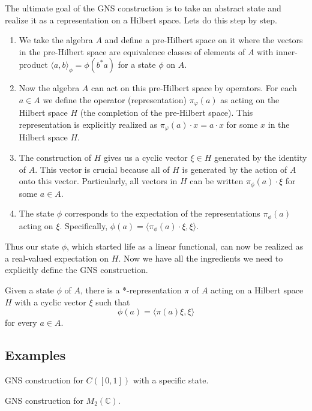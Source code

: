 The ultimate goal of the GNS construction is to take an abstract state
and realize it as a representation on a Hilbert space. Lets do this step by step.
\begin{enumerate}
    \item We take the algebra $A$ and define a pre-Hilbert space on it where the vectors
    in the pre-Hilbert space are equivalence classes of elements of $A$ with inner-product
    $\langle a, b \rangle_\phi = \phi(b^*a)$ for a state $\phi$ on $A$.
    \item Now the algebra $A$ can act on this pre-Hilbert space by operators. For
    each $a \in A$ we define the operator (representation) $\pi_\varphi (a)$ as acting
    on the Hilbert space $H$ (the completion of the pre-Hilbert space). This representation
    is explicitly realized as $\pi_\varphi(a) \cdot x = a \cdot x$ for some $x$ in
    the Hilbert space $H$.
    \item The construction of $H$ gives us a cyclic vector $\xi \in H$ generated by
    the identity of $A$. This vector is crucial because all of $H$ is generated
    by the action of $A$ onto this vector. Particularly, all vectors in $H$ can
    be written $\pi_\phi(a) \cdot \xi$ for some $a \in A$.
    \item The state $\phi$ corresponds to the expectation of the representations
    $\pi_\phi(a)$ acting on $\xi$. Specifically, $\phi(a) = \langle \pi_\phi(a) \cdot \xi, \xi \rangle$.
\end{enumerate}
Thus our state $\phi$, which started life as a linear functional, can now be realized
as a real-valued expectation on $H$. Now we have all the ingredients we need to
explicitly define the GNS construction.

\begin{theorem}
    Given a state $\phi$ of $A$, there is a *-representation $\pi$ of $A$ acting
    on a Hilbert space $H$ with a cyclic vector $\xi$ such that
    \begin{equation*}
        \phi(a) = \langle \pi(a)\xi , \xi \rangle
    \end{equation*}
    for every $a \in A$.
\end{theorem}


\subsection{Examples}
\begin{example}
GNS construction for \( C([0,1]) \) with a specific state.
\end{example}
\begin{example}
GNS construction for \( M_2(\mathbb{C}) \).
\end{example}
